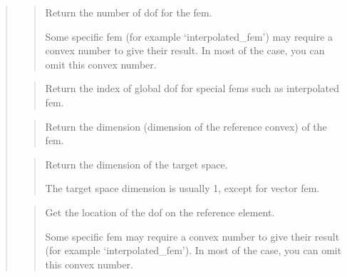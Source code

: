 \documentclass[a4paper,11pt,english]{sphinxmanual}
\begin{document}
\sphinxAtStartPar
{}
\begin{quote}

\sphinxAtStartPar
{}
\begin{quote}

\sphinxAtStartPar
Return the number of dof for the fem.

\sphinxAtStartPar
Some specific fem (for example ‘interpolated\_fem’) may require a
convex number  to give their result. In most of the case, you
can omit this convex number.
\end{quote}

\sphinxAtStartPar
{}
\begin{quote}

\sphinxAtStartPar
Return the index of global dof for special fems such as interpolated fem.
\end{quote}

\sphinxAtStartPar
{}
\begin{quote}

\sphinxAtStartPar
Return the dimension (dimension of the reference convex) of the fem.
\end{quote}

\sphinxAtStartPar
{}
\begin{quote}

\sphinxAtStartPar
Return the dimension of the target space.

\sphinxAtStartPar
The target space dimension is usually 1, except for vector fem.
\end{quote}

\sphinxAtStartPar
{}
\begin{quote}

\sphinxAtStartPar
Get the location of the dof on the reference element.

\sphinxAtStartPar
Some specific fem may require a convex number  to give their
result (for example ‘interpolated\_fem’). In most of the case, you
can omit this convex number.
\end{quote}


\end{quote}
\end{document}
